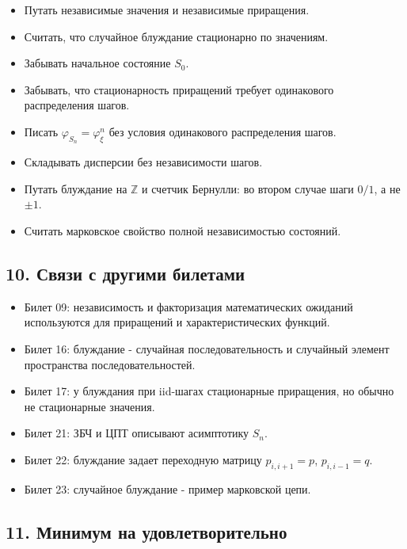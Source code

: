\documentclass[
  11pt,
  a4paper,
]{article}
\providecommand{\tightlist}{%
  \setlength{\itemsep}{0pt}\setlength{\parskip}{0pt}}
\begin{document}
\begin{itemize}
\tightlist
\item
  Путать независимые значения и независимые приращения.
\item
  Считать, что случайное блуждание стационарно по значениям.
\item
  Забывать начальное состояние \(S_0\).
\item
  Забывать, что стационарность приращений требует одинакового
  распределения шагов.
\item
  Писать \(\varphi_{S_n}=\varphi_\xi^n\) без условия одинакового
  распределения шагов.
\item
  Складывать дисперсии без независимости шагов.
\item
  Путать блуждание на \(\mathbb Z\) и счетчик Бернулли: во втором случае
  шаги \(0/1\), а не \(\pm1\).
\item
  Считать марковское свойство полной независимостью состояний.
\end{itemize}

\subsection{10. Связи с другими
билетами}\label{ux441ux432ux44fux437ux438-ux441-ux434ux440ux443ux433ux438ux43cux438-ux431ux438ux43bux435ux442ux430ux43cux438}

\begin{itemize}
\tightlist
\item
  Билет 09: независимость и факторизация математических ожиданий
  используются для приращений и характеристических функций.
\item
  Билет 16: блуждание - случайная последовательность и случайный элемент
  пространства последовательностей.
\item
  Билет 17: у блуждания при iid-шагах стационарные приращения, но обычно
  не стационарные значения.
\item
  Билет 21: ЗБЧ и ЦПТ описывают асимптотику \(S_n\).
\item
  Билет 22: блуждание задает переходную матрицу \(p_{i,i+1}=p\),
  \(p_{i,i-1}=q\).
\item
  Билет 23: случайное блуждание - пример марковской цепи.
\end{itemize}

\subsection{11. Минимум на
удовлетворительно}\label{ux43cux438ux43dux438ux43cux443ux43c-ux43dux430-ux443ux434ux43eux432ux43bux435ux442ux432ux43eux440ux438ux442ux435ux43bux44cux43dux43e}
\end{document}

